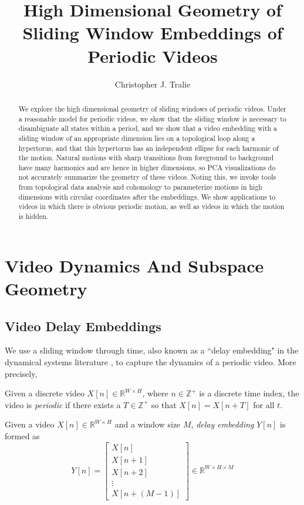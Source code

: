 \documentclass[a4paper,UKenglish]{lipics}
\title{High Dimensional Geometry of Sliding Window Embeddings of Periodic Videos}
\author[1]{Christopher J. Tralie}
\affil[1]{Department of Electrical and Computer Engineering, Duke University\\
  Durham, NC USA
  \texttt{chris.tralie@gmail.com}}
\begin{document}
\maketitle

\begin{abstract}
We explore the high dimensional geometry of sliding windows of periodic videos. Under a reasonable model for periodic videos, we show that the sliding window is necessary to disambiguate all states within a period, and we show that a video embedding with a sliding window of an appropriate dimension lies on a topological loop along a hypertorus, and that this hypertorus has an independent ellipse for each harmonic of the motion.  Natural motions with sharp transitions from foreground to background have many harmonics and are hence in higher dimensions, so PCA visualizations do not accurately summarize the geometry of these videos.  Noting this, we invoke tools from topological data analysis and cohomology to parameterize motions in high dimensions with circular coordinates after the embeddings.  We show applications to videos in which there is obvious periodic motion, as well as videos in which the motion is hidden.
\end{abstract}

\section{Video Dynamics And Subspace Geometry}




\subsection{Video Delay Embeddings}
We use a sliding window through time, also known as a ``delay embedding" in the dynamical systems literature \cite{kantz2004nonlinear}, to capture the dynamics of a periodic video.  More precisely, 

\begin{definition}
Given a discrete video $X[n] \in \mathbb{R}^{W \times H}$, where $n \in \mathbb{Z}^+$ is a discrete time index, the video is {\em periodic} if there exists a $T \in \mathbb{Z}^+$ so that $X[n] = X[n + T]$ for all $t$.
\end{definition}

\begin{definition}
Given a video $X[n] \in \mathbb{R}^{W \times H}$ and a window size $M$, {\em delay embedding} $Y[n]$ is formed as 
\begin{equation}
Y[n] = \left[ \begin{array}{c} X[n] \\ X[n + 1] \\ X[n+2] \\ \vdots \\ X[n + (M-1)] \end{array} \right] \in \mathbb{R}^{W \times H \times M}
\end{equation}
\end{definition}
\end{document}
